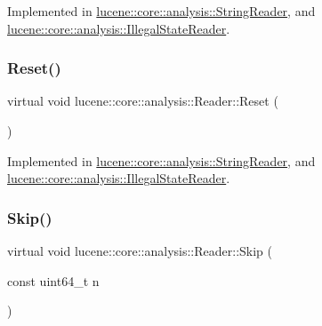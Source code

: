 Implemented in \mbox{\hyperlink{classlucene_1_1core_1_1analysis_1_1StringReader_a5bf198e593389f1255ec7a4f69f3187d}{lucene\+::core\+::analysis\+::\+String\+Reader}}, and \mbox{\hyperlink{classlucene_1_1core_1_1analysis_1_1IllegalStateReader_a39217e818ee6678830260a10885400f8}{lucene\+::core\+::analysis\+::\+Illegal\+State\+Reader}}.

\mbox{\label{classlucene_1_1core_1_1analysis_1_1Reader_a5299f5469ce4ea9812ec79a59667945a}} 
\subsubsection{\texorpdfstring{Reset()}{Reset()}}
{\footnotesize\ttfamily virtual void lucene\+::core\+::analysis\+::\+Reader\+::\+Reset (\begin{DoxyParamCaption}{ }\end{DoxyParamCaption})\hspace{0.3cm}{\ttfamily [pure virtual]}}



Implemented in \mbox{\hyperlink{classlucene_1_1core_1_1analysis_1_1StringReader_ab68ad2d8d2e375cd063c374c570fcffa}{lucene\+::core\+::analysis\+::\+String\+Reader}}, and \mbox{\hyperlink{classlucene_1_1core_1_1analysis_1_1IllegalStateReader_a7c457898d46f0dcf7de18a1730330c02}{lucene\+::core\+::analysis\+::\+Illegal\+State\+Reader}}.

\mbox{\label{classlucene_1_1core_1_1analysis_1_1Reader_a3bd8e9f3e1d07d698bccabde41970219}} 
\subsubsection{\texorpdfstring{Skip()}{Skip()}}
{\footnotesize\ttfamily virtual void lucene\+::core\+::analysis\+::\+Reader\+::\+Skip (\begin{DoxyParamCaption}\item[{const uint64\+\_\+t}]{n }\end{DoxyParamCaption})\hspace{0.3cm}{\ttfamily [pure virtual]}}



